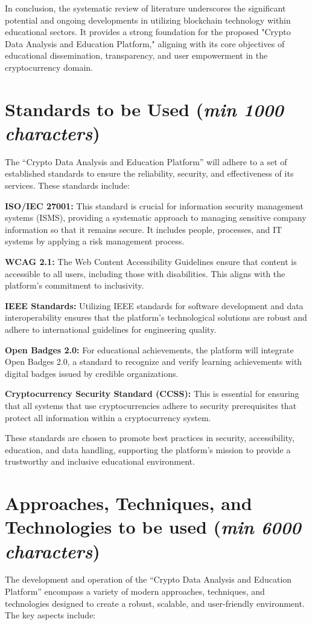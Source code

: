 \documentclass[12pt]{report}
\newcommand{\characters}[1]{(\textit{min #1 characters})}
\begin{document}
In conclusion, the systematic review of literature underscores the significant potential and ongoing developments in utilizing blockchain technology within educational sectors. It provides a strong foundation for the proposed "Crypto Data Analysis and Education Platform," aligning with its core objectives of educational dissemination, transparency, and user empowerment in the cryptocurrency domain.

\section{Standards to be Used \characters{1000}}
The ``Crypto Data Analysis and Education Platform'' will adhere to a set of established standards to ensure the reliability, security, and effectiveness of its services. These standards include:

\textbf{ISO/IEC 27001:} This standard is crucial for information security management systems (ISMS), providing a systematic approach to managing sensitive company information so that it remains secure. It includes people, processes, and IT systems by applying a risk management process.

\textbf{WCAG 2.1:} The Web Content Accessibility Guidelines ensure that content is accessible to all users, including those with disabilities. This aligns with the platform's commitment to inclusivity.

\textbf{IEEE Standards:} Utilizing IEEE standards for software development and data interoperability ensures that the platform's technological solutions are robust and adhere to international guidelines for engineering quality.

\textbf{Open Badges 2.0:} For educational achievements, the platform will integrate Open Badges 2.0, a standard to recognize and verify learning achievements with digital badges issued by credible organizations.

\textbf{Cryptocurrency Security Standard (CCSS):} This is essential for ensuring that all systems that use cryptocurrencies adhere to security prerequisites that protect all information within a cryptocurrency system.

These standards are chosen to promote best practices in security, accessibility, education, and data handling, supporting the platform’s mission to provide a trustworthy and inclusive educational environment.

\section{Approaches, Techniques, and Technologies to be used \characters{6000}}
The development and operation of the ``Crypto Data Analysis and Education Platform'' encompass a variety of modern approaches, techniques, and technologies designed to create a robust, scalable, and user-friendly environment. The key aspects include:
\end{document}
